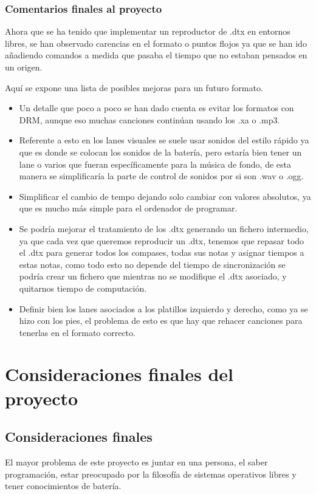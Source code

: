 \documentclass[a4paper,11pt,oneside]{book}
\begin{document}
\subsection{Comentarios finales al proyecto}
Ahora que se ha tenido que implementar un reproductor de .dtx en entornos libres, se han observado carencias en el formato o puntos flojos ya que se han ido añadiendo comandos a medida que pasaba el tiempo que no estaban pensados en un origen.

Aquí se expone una lista de posibles mejoras para un futuro formato.

\begin{itemize}
  \item Un detalle que poco a poco se han dado cuenta es evitar los formatos con DRM, aunque eso muchas canciones continúan usando los .xa o .mp3. 
  \item Referente a esto en los lanes visuales se suele usar sonidos del estilo rápido ya que es donde se colocan los sonidos de la batería, pero estaría bien tener un lane o varios que fueran específicamente para la música de fondo, de esta manera se simplificaría la parte de control de sonidos por si son .wav o .ogg.
  \item Simplificar el cambio de tempo dejando solo cambiar con valores absolutos, ya que es mucho más simple para el ordenador de programar.
  \item Se podría mejorar el tratamiento de los .dtx generando un fichero intermedio, ya que cada vez que queremos reproducir un .dtx, tenemos que repasar todo el .dtx para generar todos los compases, todas sus notas y asignar tiempos a estas notas, como todo esto no depende del tiempo de sincronización se podría crear un fichero que mientras no se modifique el .dtx asociado, y quitarnos tiempo de computación.
  \item Definir bien los lanes asociados a los platillos izquierdo y derecho, como ya se hizo con los pies, el problema de esto es que hay que rehacer canciones para tenerlas en el formato correcto.
\end{itemize}

\chapter{Consideraciones finales del proyecto}

\section{Consideraciones finales}
El mayor problema de este proyecto es juntar en una persona, el saber programación, estar preocupado por la filosofía de sistemas operativos libres y tener conocimientos de batería.
\end{document}
